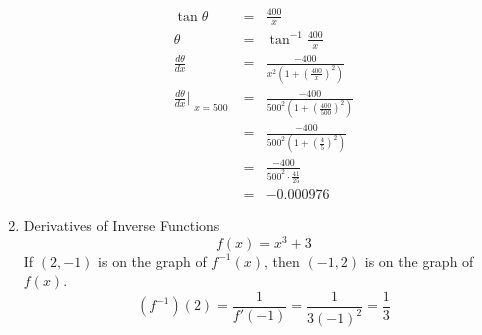 \documentclass{article}
\begin{document}
\begin{enumerate}
\begin{eqnarray}
        \tan{\theta} &=& \frac{400}{x} \\
        \theta &=& \tan^{-1}{\frac{400}{x}} \\
        \frac{d\theta}{dx} &=& \frac{-400}{x^2\left(1 + \left(\frac{400}{x}\right)^2\right)} \\
        \frac{d\theta}{dx}\Bigr|_{\substack{x = 500}} &=& \frac{-400}{500^2\left(1 + \left(\frac{400}{500}\right)^2\right)} \\
                                                      &=& \frac{-400}{500^2\left(1 + \left(\frac{4}{5}\right)^2\right)} \\
                                                      &=& \frac{-400}{500^2 \cdot \frac{41}{25}} \\
                                                      &=& -0.000976
    \end{eqnarray}
    \item Derivatives of Inverse Functions
        $$f(x) = x^3 + 3$$
        If $(2, -1)$ is on the graph of $f^{-1}(x)$, then $(-1, 2)$ is on the graph of $f(x)$.
        $$\left(f^{-1}\right)\left(2\right) = \frac{1}{f'\left(-1\right)} = \frac{1}{3\left(-1\right)^2} = \frac{1}{3}$$
\end{enumerate}
\end{document}
